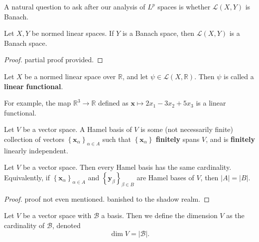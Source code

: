 \documentclass[11pt, letterpaper]{report}
\begin{document}
A natural question to ask after our analysis of $L^p$ spaces is whether $\mathscr{L} (X,Y)$ is Banach.

\begin{theorem}\label{thm:2.5}
	Let $X,Y$ be normed linear spaces. If $Y$ is a Banach space, then $\mathscr{L} (X,Y)$ is a Banach space.
\end{theorem}
\begin{proof}
	partial proof provided.
\end{proof}
\begin{definition}\label{dfn:2.15}
	Let $X$ be a normed linear space over $\mathbb{R}$, and let $\psi \in \mathscr{L} (X,\mathbb{R})$. Then $\psi $ is called a \textbf{linear} \textbf{functional}.
\end{definition}
For example, the map $\mathbb{R}^3\to \mathbb{R}$ defined as $\mathbf{x}\mapsto 2x_1-3x_2+5x_3$ is a linear functional.
\begin{definition}\label{dfn:2.16}
	Let $V$ be a vector space. A Hamel basis of $V$ is some (not necessarily finite) collection of vectors $\left\{ \mathbf{x}_\alpha  \right\}_{\alpha \in A}$ such that $\left\{ \mathbf{x}_\alpha  \right\} $ \textbf{finitely} spans $V$, and is \textbf{finitely} linearly independent.
\end{definition}
\begin{theorem}\label{thm:2.6}
	Let $V$ be a vector space. Then every Hamel basis has the same cardinality. Equivalently, if $\left\{ \mathbf{x}_\alpha  \right\} _{\alpha \in A}$ and $\left\{ \mathbf{y}_\beta  \right\} _{\beta \in B}$ are Hamel bases of $V$, then $\left| A \right| =\left| B \right| $.
\end{theorem}
\begin{proof}
	proof not even mentioned. banished to the shadow realm.
\end{proof}
\begin{definition}[Dimension]\label{dfn:2.17}
	Let $V$ be a vector space with $\mathcal{B} $ a basis. Then we define the dimension $V$ as the cardinality of $\mathcal{B} $, denoted
	\[
		\dim V=\left| \mathcal{B}  \right| 
	.\]
\end{definition}
\end{document}
